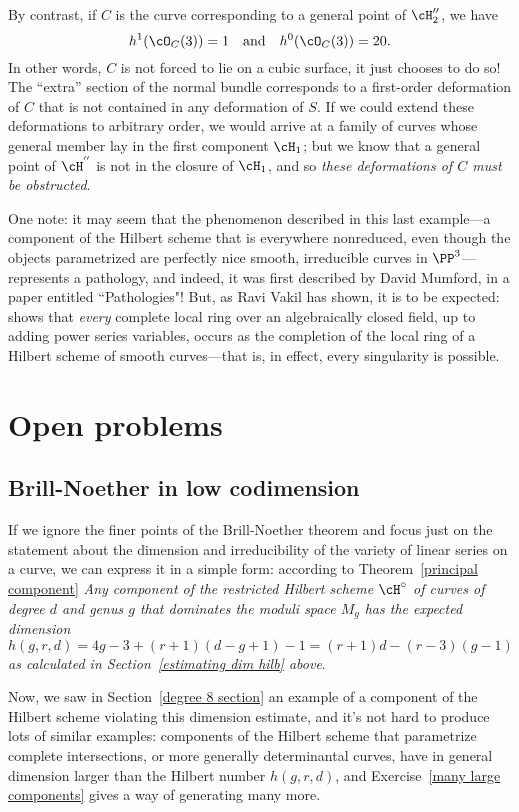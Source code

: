 By contrast, if $C$ is the curve corresponding to a general point of $\cH_{2}''$, we have
$$
h^1(\cO_C(3)) = 1 \quad \text{and} \quad h^0(\cO_C(3)) = 20.
$$
In other words, $C$ is not forced to lie on a cubic surface, it just chooses to do so! The ``extra'' section of the normal bundle corresponds to a first-order deformation of $C$ that is not contained in any deformation of $S$. 
If we could extend these deformations to arbitrary order, we would arrive at a family of curves whose general member lay in the first component $\cH_1$; but we know that a general point of $ \cH^{''}$ is not in the closure of $\cH_1$, and so \emph{these deformations of $C$ must be obstructed}.

One note: it may seem that the phenomenon described in this last example---a component of the Hilbert scheme that is everywhere nonreduced, even though the objects parametrized are perfectly nice smooth, irreducible curves in $\PP^3$---represents a pathology, and indeed, it was first described by David Mumford, in a paper entitled ``Pathologies"! But, as Ravi Vakil has shown, it is to be expected: \cite{MR2227692} shows that \emph{every} complete local ring over an algebraically closed field, up to adding power series variables, occurs as the completion of the local ring of a Hilbert scheme of smooth curves---that is, in effect, every singularity is possible. 

\section{Open problems}\label{open problems}

\subsection{Brill-Noether in low codimension}

If we ignore the finer points of the Brill-Noether theorem and focus just on the statement about the dimension and irreducibility of the variety of linear series on a curve, we can express it in a simple form: according to Theorem~\ref{principal component} \emph{Any component of the restricted Hilbert scheme $\cH^\circ$ of curves of degree $d$ and genus $g$ that dominates the moduli space $M_g$ has the expected dimension 
$$
h(g,r,d) = 4g-3 + (r+1)(d-g+1) - 1 = (r+1)d - (r-3)(g-1)
$$
 as calculated in Section~\ref{estimating dim hilb} above}.
 
 
Now, we saw in Section~\ref{degree 8 section} an example of a component of the Hilbert scheme violating this dimension estimate, and it's not hard to produce lots of similar examples: components of the Hilbert scheme that parametrize complete intersections, or more generally determinantal curves, have in general dimension larger than the Hilbert number $h(g,r,d)$, and Exercise~\ref{many large components} gives a way of generating many more.


